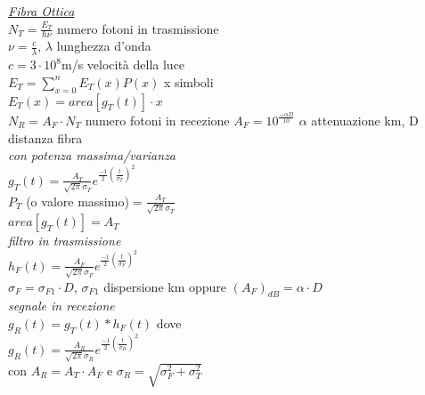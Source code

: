 \documentclass[a4paper]{article}
\begin{document}
\begin{multicols*}{3}
\underline{\textit{Fibra Ottica}} \\
$N_T = \frac{E_T}{\hbar\nu}$ numero fotoni in trasmissione \\
$\nu = \frac{c}{\lambda}$, $\lambda$ lunghezza d'onda \\
$c=3\cdot10^8$m/s  velocità della luce \\
$E_T = \sum_{x=0}^{n}{E_T(x)P(x)}$ x simboli \\
$E_T(x) = area[g_T(t)]\cdot x$ \\
$N_R = A_F\cdot N_T$ numero fotoni in recezione
$A_F = 10^{\frac{-\alpha D}{10}}$ $\alpha$ attenuazione km, D distanza fibra\\
\textit{con potenza massima/varianza }\\
$g_T(t)=\frac{A_T}{\sqrt{2\pi}\sigma_T}e^{\frac{-1}{2}{(\frac{t}{\sigma_T})}^{2}}$
\\ $P_T$ (o valore massimo)$=\frac{A_T}{\sqrt{2\pi}\sigma_T}$ \\
$area[g_T(t)] = A_T$ \\
\textit{filtro in trasmissione }\\
$h_F(t)=\frac{A_F}{\sqrt{2\pi}\sigma_F}e^{\frac{-1}{2}{(\frac{t}{\sigma_F})}^{2}}$ \\
$\sigma_F=\sigma_{F1} \cdot D$, $\sigma_{F1}$ dispersione km
oppure ${(A_F)}_{dB}=\alpha\cdot D$ \\ 
\textit{segnale in recezione}\\ 
$g_R(t)=g_T(t)*h_F(t)$ dove \\
$g_R(t)=\frac{A_R}{\sqrt{2\pi}\sigma_R}e^{\frac{-1}{2}{(\frac{t}{\sigma_R})}^{2}}$
\\ con $A_R = A_T \cdot A_F$ e $\sigma_R = \sqrt{\sigma_F^2 + \sigma_T^2}$
\end{multicols*}
\end{document}
